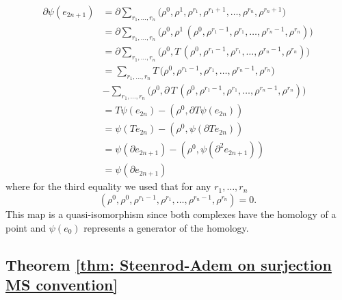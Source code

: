 \begin{align*}
\partial \psi(e_{2n+1}) & = 
\partial \sum_{r_1, \dots, r_n} 
\big(\rho^0, \rho^1, \rho^{r_1}, \rho^{r_1+1}, \dots, \rho^{r_n}, \rho^{r_n+1} \big)  \\ & =
\partial \sum_{r_1, \dots, r_n}
\big(\rho^0, \rho^{1} \, (\rho^0, \rho^{r_1-1}, \rho^{r_1}, \dots, \rho^{r_n - 1}, \rho^{r_n}) \big) \\ & =
\partial \sum_{r_1, \dots, r_n}
\big(\rho^0, T\, (\rho^0, \rho^{r_1-1}, \rho^{r_1}, \dots, \rho^{r_n - 1}, \rho^{r_n}) \big) \\ & =
\sum_{r_1, \dots, r_n}
T \, \big( \rho^0, \rho^{r_1-1}, \rho^{r_1}, \dots, \rho^{r_n - 1}, \rho^{r_n} \big) \\ & -
\sum_{r_1, \dots, r_n}
\big(\rho^0, \partial \, T \, (\rho^0, \rho^{r_1-1}, \rho^{r_1}, \dots, \rho^{r_n - 1}, \rho^{r_n}) \big) \\ & =
T \psi(e_{2n}) - (\rho^0, \partial T \psi (e_{2n})) \\ & =
\psi(T e_{2n}) - (\rho^0, \psi (\partial T e_{2n})) \\ & =
\psi(\partial e_{2n+1}) - (\rho^0, \psi (\partial^2 e_{2n+1})) \\ & =
\psi(\partial e_{2n+1})
\end{align*}
where for the third equality we used that for any $r_1, \dots, r_n$
\begin{equation*}
(\rho^0, \rho^0, \rho^{r_1-1}, \rho^{r_1}, \dots, \rho^{r_n - 1}, \rho^{r_n}) = 0.
\end{equation*}
This map is a quasi-isomorphism since both complexes have the homology of a point and $\psi(e_0)$ represents a generator of the homology.

\subsection{Theorem \ref{thm: Steenrod-Adem on surjection MS convention}}

